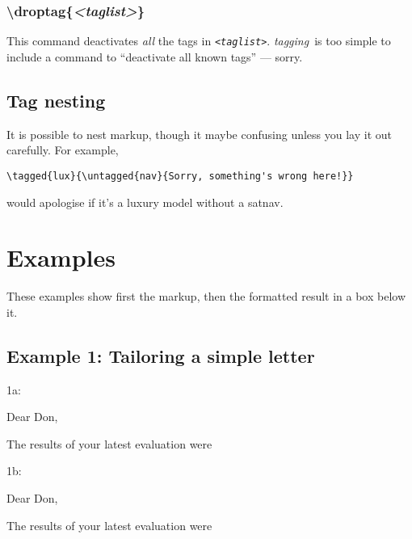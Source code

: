\documentclass[a4paper,12pt,twoside,openany]{memoir}
\newcommand{\tpn}{tagging}
\newcommand{\tpname}{\textsf{\itshape \tpn}}
\begin{document}
\subsection{{\ttfamily\textbackslash droptag\{{\itshape<taglist>}\}}}
This command deactivates \emph{all} the tags in \texttt{\itshape<taglist>}.
\tpname\ is too simple to include a command 
to ``deactivate all known tags'' --- sorry.

\section{Tag nesting}
It is possible to nest markup, though it maybe confusing unless you lay it out carefully.
For example,
\begin{verbatim}
\tagged{lux}{\untagged{nav}{Sorry, something's wrong here!}}
\end{verbatim}
would apologise if it's a luxury model without a satnav.

\chapter{Examples}
These examples show first the markup, then the formatted result in a box below it.
\section{Example 1: Tailoring a simple letter}
\noindent 1a:
\begin{LTXexample}[pos=b]

Dear Don,

The results of your latest evaluation were

\end{LTXexample}

\noindent 1b:
\begin{LTXexample}[pos=b]

Dear Don,

The results of your latest evaluation were

\end{LTXexample}
\end{document}
